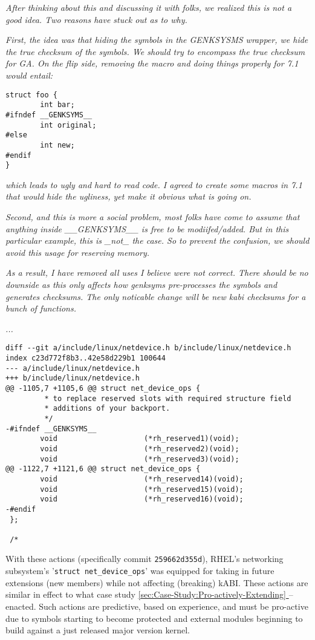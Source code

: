 \documentclass[10pt,oneside,english]{book}
\newcommand*{\fullref}[1]{\hyperref[{#1}]{\autoref*{#1} \nameref*{#1}}}
\begin{document}
\emph{After thinking about this and discussing it with folks, we realized
this is not a good idea.  Two reasons have stuck out as to why.}

\emph{First, the idea was that hiding the symbols in the GENKSYSMS
wrapper, we hide the true checksum of the symbols.  We should try
to encompass the true checksum for GA.  On the flip side, removing
the macro and doing things properly for 7.1 would entail:}

\begin{lstlisting}
struct foo {
        int bar;
#ifndef __GENKSYMS__
        int original;
#else
        int new;
#endif
}
\end{lstlisting}

\emph{which leads to ugly and hard to read code.  I agreed to create
some macros in 7.1 that would hide the ugliness, yet make it obvious
what is going on.}

\emph{Second, and this is more a social problem, most folks have come
to assume that anything inside \_\_GENKSYMS\_\_ is free to be modiifed/added.
 But in this particular example, this is \_not\_ the case.  So to
prevent the confusion, we should avoid this usage for reserving memory.}

\emph{As a result, I have removed all uses I believe were not correct.
 There should be no downside as this only affects how genksyms pre-processes
the symbols and generates checksums.  The only noticable change will
be new kabi checksums for a bunch of functions.}

\emph{...}

\begin{lstlisting}
diff --git a/include/linux/netdevice.h b/include/linux/netdevice.h
index c23d772f8b3..42e58d229b1 100644
--- a/include/linux/netdevice.h
+++ b/include/linux/netdevice.h
@@ -1105,7 +1105,6 @@ struct net_device_ops {
         * to replace reserved slots with required structure field
         * additions of your backport.
         */
-#ifndef __GENKSYMS__
        void                    (*rh_reserved1)(void);
        void                    (*rh_reserved2)(void);
        void                    (*rh_reserved3)(void);
@@ -1122,7 +1121,6 @@ struct net_device_ops {
        void                    (*rh_reserved14)(void);
        void                    (*rh_reserved15)(void);
        void                    (*rh_reserved16)(void);
-#endif
 };
 
 /*
\end{lstlisting}

With these actions (specifically commit \texttt{259662d355d}), RHEL's
networking subsystem's '\texttt{struct net\_device\_ops}' was equipped
for taking in future extensions (new members) while not affecting
(breaking) kABI. These actions are similar in effect to what case
study \fullref{sec:Case-Study:Pro-actively-Extending}
-- enacted. Such actions are predictive, based on experience, and
must be pro-active due to symbols starting to become protected and
external modules beginning to build against a just released major
version kernel.
\end{document}

